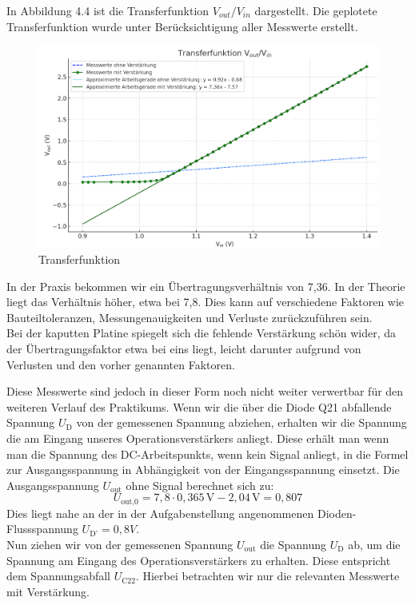 In Abbildung 4.4 ist die Transferfunktion $V_{out}/V_{in}$ dargestellt. Die geplotete Transferfunktion wurde
unter Berücksichtigung aller Messwerte erstellt.\\

\begin{figure}[H]
    \centering
    \includegraphics[width=1\textwidth]{Pictures/Transferfunktion.jpf.png}
    \caption{Transferfunktion}
    \label{fig:opamp_schaltung}
\end{figure}
In der Praxis bekommen wir ein Übertragungsverhältnis von 7,36.
In der Theorie liegt das Verhältnis höher, etwa bei 7,8. 
Dies kann auf verschiedene Faktoren wie Bauteiltoleranzen, Messungenauigkeiten und Verluste zurückzuführen sein.
\\
Bei der kaputten Platine spiegelt sich die fehlende Verstärkung schön wider, da der Übertragungsfaktor etwa bei eins liegt,
leicht darunter aufgrund von Verlusten und den vorher genannten Faktoren.

Diese Messwerte sind jedoch in dieser Form noch nicht weiter verwertbar für den weiteren Verlauf 
des Praktikums. Wenn wir die über die Diode Q21 abfallende Spannung $U_{\text{D}}$ von der gemessenen
Spannung abziehen, erhalten wir die Spannung die am Eingang unseres Operationsverstärkers anliegt.
Diese erhält man wenn man die Spannung des DC-Arbeitspunkts, wenn kein Signal anliegt, in die Formel zur Ausgangsspannung
in Abhängigkeit von der Eingangsspannung einsetzt.
Die Ausgangsspannung $U_\text{out}$ ohne Signal berechnet sich zu:
\[
U_\text{out,0} = 7{,}8 \cdot 0{,}365\,\text{V} - 2{,}04\,\text{V} = 0{,}807\]
Dies liegt nahe an der in der Aufgabenstellung angenommenen Dioden-Flussspannung $U_\text{D'} = 0,8V$. \\
Nun ziehen wir von der gemessenen Spannung $U_\text{out}$ die Spannung $U_\text{D}$ ab, um die Spannung am 
Eingang des Operationsverstärkers zu erhalten. Diese entspricht dem Spannungsabfall $U_\text{C22}$. Hierbei
betrachten wir nur die relevanten Messwerte mit Verstärkung. 

